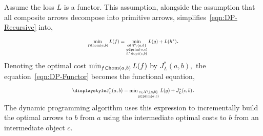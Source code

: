 \documentclass[a4paper]{ifacconf}
\begin{document}
Assume the loss \(L\) is a functor.
This assumption, alongside the assumption that all composite arrows decompose into primitive arrows, simplifies~\eqref{eqn:DP-Recursive} into,
%
\begin{equation}
  \label{eqn:DP-Functor}
  \scalebox{0.7}{\mbox{\ensuremath{\displaystyle%
    \min_{f \in \HomSet(a,b)} \Loss(f) 
      =
          \min_{
            \begin{subarray}{c}
              c   \in \mathcal{X} \setminus \{a, b\}\\
              g   \in \PrimSet(a, c)\\
              h^* \in \OptSet(c, b)
            \end{subarray}
          }{
            \Loss(g) + \Loss(h^*)
          }
  }}}.
\end{equation}
%
Denoting the optimal cost \(\min_{f \in \mathrm{hom}(a,b)} {L}(f)\) by \(J^*_{L}(a, b),\) the equation~\eqref{eqn:DP-Functor} becomes the functional equation,
%
\begin{equation}
  \label{eqn:DP-Classic}
  \scalebox{0.7}{\mbox{\ensuremath{\displaystyle%
    J^*_L(a,b)
      =
          \min_{
            \begin{subarray}{c}
              c   \in \mathcal{X} \setminus \{a, b\}\\
              g   \in \PrimSet(a, c)
            \end{subarray}
          }{
            \Loss(g) + J^*_L(c,b)
          }
  }}}.
\end{equation}
The dynamic programming algorithm uses this expression to incrementally build the optimal arrows to \(b\) from \(a\) using the intermediate optimal costs to \(b\) from an intermediate object \(c.\)
\end{document}
